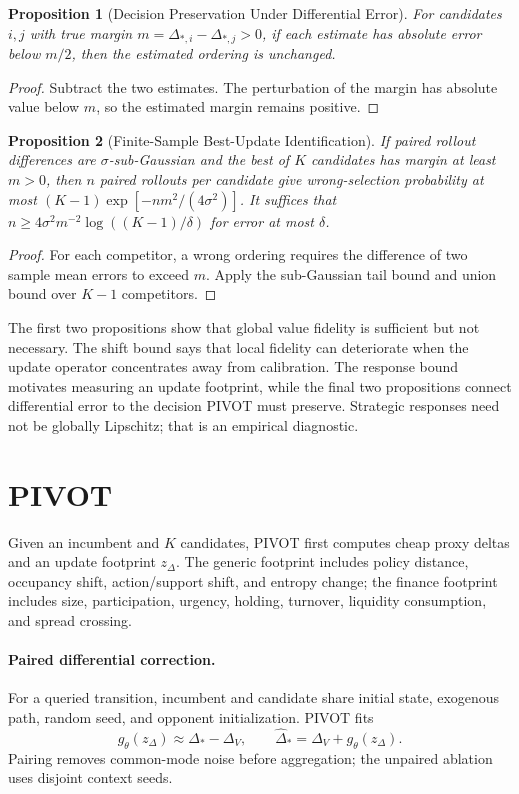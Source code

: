 \documentclass{article}
\newtheorem{proposition}{Proposition}
\begin{document}
\begin{proposition}[Decision Preservation Under Differential Error]
For candidates $i,j$ with true margin
$m=\Delta_{*,i}-\Delta_{*,j}>0$, if each estimate has absolute error below
$m/2$, then the estimated ordering is unchanged.
\end{proposition}
\begin{proof}
Subtract the two estimates.  The perturbation of the margin has absolute
value below $m$, so the estimated margin remains positive.
\end{proof}

\begin{proposition}[Finite-Sample Best-Update Identification]
If paired rollout differences are $\sigma$-sub-Gaussian and the best of $K$
candidates has margin at least $m>0$, then $n$ paired rollouts per candidate
give wrong-selection probability at most
$(K-1)\exp[-nm^2/(4\sigma^2)]$.  It suffices that
$n\geq4\sigma^2m^{-2}\log((K-1)/\delta)$ for error at most $\delta$.
\end{proposition}
\begin{proof}
For each competitor, a wrong ordering requires the difference of two sample
mean errors to exceed $m$.  Apply the sub-Gaussian tail bound and union bound
over $K-1$ competitors.
\end{proof}

The first two propositions show that global value fidelity is sufficient but
not necessary.  The shift bound says that local fidelity can deteriorate when
the update operator concentrates away from calibration.  The response bound
motivates measuring an update footprint, while the final two propositions
connect differential error to the decision PIVOT must preserve.  Strategic
responses need not be globally Lipschitz; that is an empirical diagnostic.

\section{PIVOT}
Given an incumbent and $K$ candidates, PIVOT first computes cheap proxy
deltas and an update footprint $z_{\Delta}$.  The generic footprint includes
policy distance, occupancy shift, action/support shift, and entropy change;
the finance footprint includes size, participation, urgency, holding,
turnover, liquidity consumption, and spread crossing.

\paragraph{Paired differential correction.}
For a queried transition, incumbent and candidate share initial state,
exogenous path, random seed, and opponent initialization.  PIVOT fits
\begin{equation}
  g_\theta(z_{\Delta})\approx\Delta_* - \Delta_V,
  \qquad \widehat\Delta_* = \Delta_V+g_\theta(z_{\Delta}).
\end{equation}
Pairing removes common-mode noise before aggregation; the unpaired ablation
uses disjoint context seeds.
\end{document}
